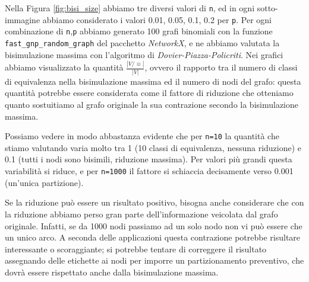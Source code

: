 Nella Figura \ref{fig:bisi_size} abbiamo tre diversi valori di \verb|n|, ed in ogni sotto-immagine abbiamo considerato i valori 0.01, 0.05, 0.1, 0.2 per \verb|p|. Per ogni combinazione di \verb|n|,\verb|p| abbiamo generato 100 grafi binomiali con la funzione \verb|fast_gnp_random_graph| del pacchetto \emph{NetworkX}, e ne abbiamo valutata la bisimulazione massima con l'algoritmo di \emph{Dovier-Piazza-Policriti}. Nei grafici abbiamo visualizzato la quantità $\frac{|V / \equiv|}{|V|}$, ovvero il rapporto tra il numero di classi di equivalenza nella bisimulazione massima ed il numero di nodi del grafo: questa quantità potrebbe essere considerata come il fattore di riduzione che otteniamo quanto sostuitiamo al grafo originale la sua contrazione secondo la bisimulazione massima.

Possiamo vedere in modo abbastanza evidente che per \verb|n=10| la quantità che stiamo valutando varia molto tra 1 (10 classi di equivalenza, nessuna riduzione) e 0.1 (tutti i nodi sono bisimili, riduzione massima). Per valori più grandi questa variabilità si riduce, e per \verb|n=1000| il fattore si schiaccia decisamente verso 0.001 (un'unica partizione).

Se la riduzione può essere un risultato positivo, bisogna anche considerare che con la riduzione abbiamo perso gran parte dell'informazione veicolata dal grafo originale. Infatti, se da 1000 nodi passiamo ad un solo nodo non vi può essere che un unico arco. A seconda delle applicazioni questa contrazione potrebbe risultare interessante o scoraggiante; si potrebbe tentare di correggere il risultato assegnando delle etichette ai nodi per imporre un partizionamento preventivo, che dovrà essere rispettato anche dalla bisimulazione massima.
